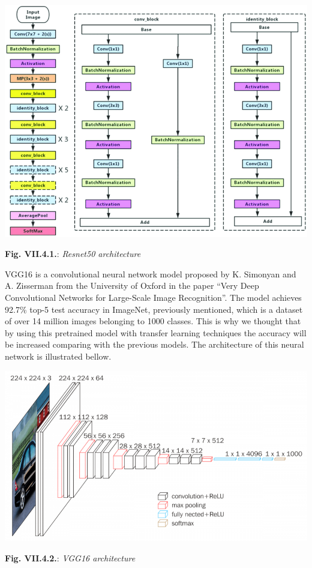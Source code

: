 \documentclass[11pt, a4papper]{report}
\theoremstyle{plain}
\theoremstyle{definition}
\theoremstyle{definition}
\theoremstyle{proposition}
\begin{document}
\begin{center}
\includegraphics[scale=0.38]{resnet50.png}
\end{center}
\begin{center}
\textbf{Fig. VII.4.1.}: \textit{Resnet50 architecture}
\end{center}

VGG16 is a convolutional neural network model proposed by K. Simonyan and A. Zisserman from the University of Oxford in the paper “Very Deep Convolutional Networks for Large-Scale Image Recognition”. The model achieves 92.7\% top-5 test accuracy in ImageNet, previously mentioned, which is a dataset of over 14 million images belonging to 1000 classes. This is why we thought that by using this pretrained model with transfer learning techniques the accuracy will be increased comparing with the previous models. The architecture of this neural network is illustrated bellow.

\begin{center}
\includegraphics[scale=0.5]{vgg16.png}
\end{center}
\begin{center}
\textbf{Fig. VII.4.2.}: \textit{VGG16 architecture}
\end{center}
\end{document}
